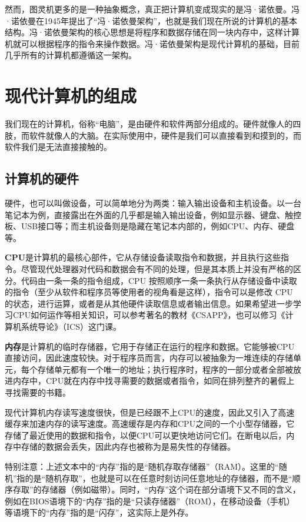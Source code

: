 \documentclass[12pt]{report}
\begin{document}
然而，图灵机更多的是一种抽象概念，真正把计算机变成现实的是冯·诺依曼。冯·诺依曼在1945年提出了“冯·诺依曼架构”，也就是我们现在所说的计算机的基本结构。冯·诺依曼架构的核心思想是将程序和数据存储在同一块内存中，这样计算机就可以根据程序的指令来操作数据。冯·诺依曼架构是现代计算机的基础，目前几乎所有的计算机都遵循这一架构。

\section{现代计算机的组成}

我们现在的计算机，俗称“电脑”，是由硬件和软件两部分组成的。硬件就像人的四肢，而软件就像人的大脑。在实际使用中，硬件是我们可以直接看到和摸到的，而软件我们是无法直接接触的。

\subsection{计算机的硬件}

硬件，也可以叫做设备，可以简单地分为两类：输入输出设备和主机设备。以一台笔记本为例，直接露出在外面的几乎都是输入输出设备，例如显示器、键盘、触控板、USB接口等；而主机设备则是隐藏在笔记本内部的，例如CPU、内存、硬盘等。

\textbf{CPU}是计算机的最核心部件，它从存储设备读取指令和数据，并且执行这些指令。尽管现代处理器对代码和数据会有不同的处理，但是其本质上并没有严格的区分。代码由一条一条的指令组成，CPU 按照顺序一条一条执行从存储设备中读取的指令（至少从软件和程序员等使用者的视角看是这样），指令可以是修改 CPU 的状态，进行运算，或者是从其他硬件读取信息或者输出信息。如果希望进一步学习CPU如何运作等相关知识，可以参考著名的教材《CSAPP》，也可以修习《计算机系统导论》（ICS）这门课。

\textbf{内存}是计算机的临时存储器，它用于存储正在运行的程序和数据。它能够被CPU直接访问，因此速度较快。对于程序员而言，内存可以被抽象为一堆连续的存储单元，每个存储单元都有一个唯一的地址；执行程序时，程序的一部分或者全部被放进内存中，CPU就在内存中找寻需要的数据或者指令，如同在排列整齐的暑假上寻找需要的书籍。

现代计算机内存读写速度很快，但是已经跟不上CPU的速度，因此又引入了高速缓存来加速内存的读写速度。高速缓存是内存和CPU之间的一个小型存储器，它存储了最近使用的数据和指令，以便CPU可以更快地访问它们。在断电以后，内存中存储的数据会丢失，因此内存也被称为是易失性的存储器。

特别注意：上述文本中的“内存”指的是“随机存取存储器”（RAM）。这里的“随机”指的是“随机存取”，也就是可以在任意时刻访问任意地址的存储器，而不是“顺序存取”的存储器（例如磁带）。同时，“内存”这个词在部分语境下又不同的含义，例如在BIOS语境下的“内存”指的是“只读存储器”（ROM），在移动设备（手机）等语境下的“内存”指的是“闪存”，这实际上是外存。
\end{document}

